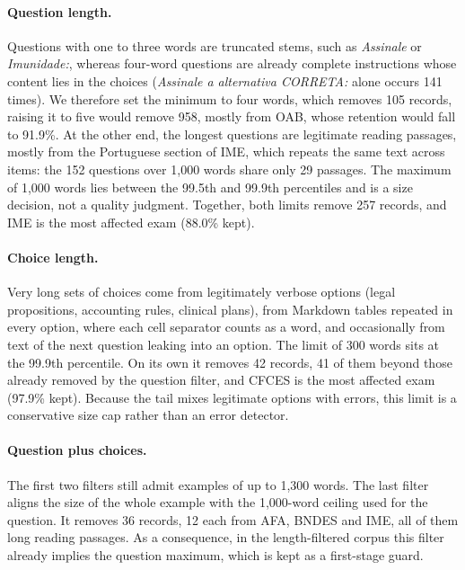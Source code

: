\paragraph{Question length.} Questions with one to three words are
truncated stems, such as \emph{Assinale} or \emph{Imunidade:}, whereas
four-word questions are already complete instructions whose content lies in
the choices (\emph{Assinale a alternativa CORRETA:} alone occurs 141 times).
We therefore set the minimum to four words, which removes 105 records, raising
it to five would remove 958, mostly from OAB, whose retention would fall to
91.9\%. At the other end, the longest questions are legitimate reading
passages, mostly from the Portuguese section of IME, which repeats the same
text across items: the 152 questions over 1,000 words share only 29 passages.
The maximum of 1,000 words lies between the 99.5th and 99.9th percentiles
and is a size decision, not a quality judgment. Together, both limits remove
257 records, and IME is the most affected exam (88.0\% kept).

\paragraph{Choice length.} Very long sets of choices come from legitimately
verbose options (legal propositions, accounting rules, clinical plans), from
Markdown tables repeated in every option, where each cell separator counts as
a word, and occasionally from text of the next question leaking into an
option. The limit of 300 words sits at the 99.9th percentile. On its own it
removes 42 records, 41 of them beyond those already removed by the question
filter, and CFCES is the most affected exam (97.9\% kept). Because the tail mixes
legitimate options with errors, this limit is a conservative size cap rather
than an error detector.

\paragraph{Question plus choices.} The first two filters still admit
examples of up to 1,300 words. The last filter aligns the size of the whole
example with the 1,000-word ceiling used for the question. It removes 36
records, 12 each from AFA, BNDES and IME, all of them long reading passages.
As a consequence, in the length-filtered corpus this filter already implies the question
maximum, which is kept as a first-stage guard.

